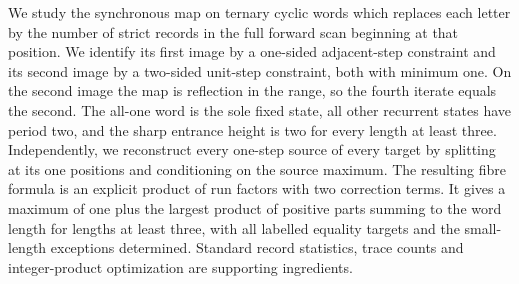 We study the synchronous map on ternary cyclic words which replaces each
letter by the number of strict records in the full forward scan beginning
at that position. We identify its first image by a one-sided adjacent-step
constraint and its second image by a two-sided unit-step constraint, both
with minimum one. On the second image the map is reflection in the range,
so the fourth iterate equals the second. The all-one word is the sole fixed
state, all other recurrent states have period two, and the sharp entrance
height is two for every length at least three. Independently, we reconstruct
every one-step source of every target by splitting at its one positions
and conditioning on the source maximum. The resulting fibre formula is an
explicit product of run factors with two correction terms. It gives a
maximum of one plus the largest product of positive parts summing to the
word length for lengths at least three, with all labelled equality targets
and the small-length exceptions determined. Standard record statistics,
trace counts and integer-product optimization are supporting ingredients.
